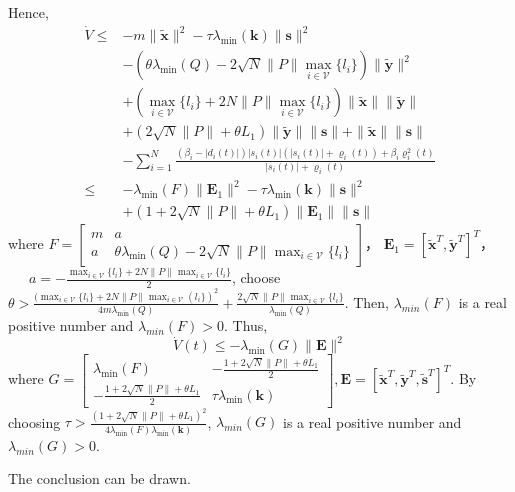 \documentclass[12pt, a4paper, oneside]{ctexbook}
\begin{document}
Hence,
\begin{equation}
    \begin{aligned}
        \dot{V}\leq & -m\|\tilde{\mathbf{x}}\|^2-\tau\lambda_{\min}(\mathbf{k})\|\mathbf{s}\|^2 \\
                    & -(\theta\lambda_{\min}(Q)-2\sqrt{N}\|P\|\max_{i\in\mathcal{V}}\{l_i\})\|\tilde{\mathbf{y}}\|^2                               \\
                    & +(\max_{i\in\mathcal{V}}\{l_i\}+2N\|P\|\max_{i\in\mathcal{V}}\{l_i\})\|\tilde{\mathbf{x}}\|\|\tilde{\mathbf{y}}\|            \\
                    & +(2\sqrt{N}\|P\|+\theta L_{1})\|\tilde{\mathbf{y}}\|\|\mathbf{s}\|+\|\tilde{\mathbf{x}}\|\|\mathbf{s}\|                      \\
                    & -\sum_{i = 1}^{N}\frac{(\beta_i - |d_i(t)|)|s_i(t)|(|s_i(t)|+\varrho_i(t)) + \beta_i\varrho_i^2(t)}{|s_i(t)| + \varrho_i(t)} \\
        \leq        & -\lambda_{\min}(F)\|\mathbf{E}_1\|^2-\tau\lambda_{\min}(\mathbf{k})\|\mathbf{s}\|^2                                          \\
                    & +(1+2\sqrt{N}\|P\|+\theta L_1)\|\mathbf{E}_1\|\|\mathbf{s}\|
    \end{aligned}
\end{equation}
where $\left.F=\left[\begin{array}{cc}m & a                                                                   \\
             a     & \theta\lambda_{\min}(Q)-2\sqrt{N}\|P\|\max_{i\in\mathcal{V}}\{l_i\}\end{array}\right.\right]$，
$\mathbf{E}_1 = [\tilde{\mathbf{x}}^T,\tilde{\mathbf{y}}^T]^T$，
~~~$a = -\frac{\max_{i\in\mathcal{V}}\{l_{i}\}+2N\|P\|\max_{i\in\mathcal{V}}\{l_{i}\}}{2}$, choose 
$\theta > \frac{(\max_{i\in\mathcal{V}}\{l_{i}\}+2N\|P\|\max_{i\in\mathcal{V}}(l_{i}\})^{2}}{4m\lambda_{\mathrm{min}}(Q)}+\frac{2\sqrt{N}\|P\|\max_{i\in\mathcal{V}}\{l_{i}\}}{\lambda_{\mathrm{min}}(Q)}$. Then, $\lambda_{min}(F)$ is a real positive number and $\lambda_{min}(F) > 0$. Thus, 
\begin{equation}
    \dot{V}(t) \leq -\lambda_{\min}(G)\|\mathbf{E}\|^2
\end{equation}
where $\left.G=\left[\begin{array}{cc}\lambda_{\min}(F)&-\frac{1+2\sqrt{N}\|P\|+\theta L_1}2\\-\frac{1+2\sqrt{N}\|P\|+\theta L_1}2&\tau\lambda_{\min}(\mathbf{k})\end{array}\right.\right],
    \mathbf{E} = [\tilde{\mathbf{x}}^T,\tilde{\mathbf{y}}^T,\tilde{\mathbf{s}}^T]^T$. By choosing 
$\tau>\frac{(1+2\sqrt{N}\|P\|+\theta L_{1})^{2}}{4\lambda_{\mathrm{min}}(F)\lambda_{\mathrm{min}}(\mathbf{k})}$, $\lambda_{min}(G)$ is a real positive number and $\lambda_{min}(G) > 0$.

The conclusion can be drawn.
\end{document}
